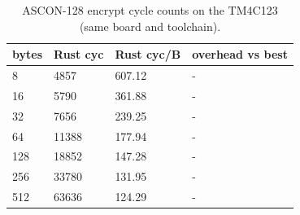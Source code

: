 \begin{table}[t]
  \centering
  \caption{ASCON-128 encrypt cycle counts on the TM4C123 (same board and toolchain).}
  \label{tab:perf}
  \begin{tabular}{llll}
    \toprule
    bytes & Rust cyc & Rust cyc/B & overhead vs best \\
    \midrule
    8 & 4857 & 607.12 & - \\
    16 & 5790 & 361.88 & - \\
    32 & 7656 & 239.25 & - \\
    64 & 11388 & 177.94 & - \\
    128 & 18852 & 147.28 & - \\
    256 & 33780 & 131.95 & - \\
    512 & 63636 & 124.29 & - \\
    \bottomrule
  \end{tabular}
\end{table}

